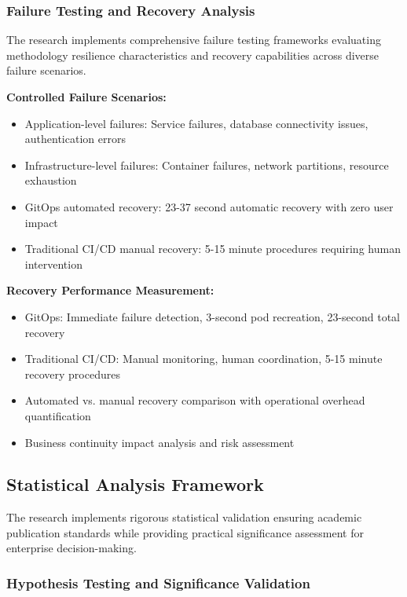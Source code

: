 \subsubsection{Failure Testing and Recovery Analysis}

The research implements comprehensive failure testing frameworks evaluating methodology resilience characteristics and recovery capabilities across diverse failure scenarios.

\textbf{Controlled Failure Scenarios:}
\begin{itemize}
\item Application-level failures: Service failures, database connectivity issues, authentication errors
\item Infrastructure-level failures: Container failures, network partitions, resource exhaustion
\item GitOps automated recovery: 23-37 second automatic recovery with zero user impact
\item Traditional CI/CD manual recovery: 5-15 minute procedures requiring human intervention
\end{itemize}

\textbf{Recovery Performance Measurement:}
\begin{itemize}
\item GitOps: Immediate failure detection, 3-second pod recreation, 23-second total recovery
\item Traditional CI/CD: Manual monitoring, human coordination, 5-15 minute recovery procedures
\item Automated vs. manual recovery comparison with operational overhead quantification
\item Business continuity impact analysis and risk assessment
\end{itemize}

\subsection{Statistical Analysis Framework}

The research implements rigorous statistical validation ensuring academic publication standards while providing practical significance assessment for enterprise decision-making.

\subsubsection{Hypothesis Testing and Significance Validation}

